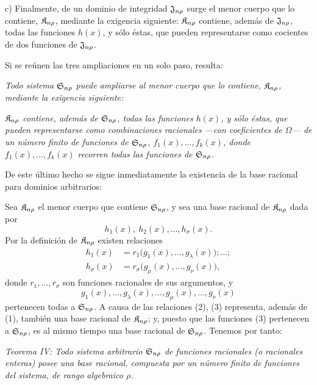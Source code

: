 \documentclass[11pt]{article}
\begin{document}
c) Finalmente, de un dominio de integridad $\mathfrak{J}_{n\rho}$ surge el menor cuerpo que lo contiene, $\mathfrak{K}_{n\rho}$, mediante la exigencia siguiente: $\mathfrak{K}_{n\rho}$ contiene, además de $\mathfrak{J}_{n\rho}$, todas las funciones $h(x)$, y sólo éstas, que pueden representarse como cocientes de dos funciones de $\mathfrak{J}_{n\rho}$.

Si se reúnen las tres ampliaciones en un solo paso, resulta:

\emph{Todo sistema $\mathfrak{S}_{n\rho}$ puede ampliarse al menor cuerpo que lo contiene, $\mathfrak{K}_{n\rho}$, mediante la exigencia siguiente:}

\emph{$\mathfrak{K}_{n\rho}$ contiene, además de $\mathfrak{S}_{n\rho}$, todas las funciones $h(x)$, y sólo éstas, que pueden representarse como combinaciones racionales ---con coeficientes de $\Omega$--- de un número finito de funciones de $\mathfrak{S}_{n\rho}$, $f_1(x),\ldots,f_k(x)$, donde $f_1(x),\ldots,f_k(x)$ recorren todas las funciones de $\mathfrak{S}_{n\rho}$.}

De este último hecho se sigue inmediatamente la existencia de la base racional para dominios arbitrarios:

Sea $\mathfrak{K}_{n\rho}$ el menor cuerpo que contiene $\mathfrak{S}_{n\rho}$, y sea una base racional de $\mathfrak{K}_{n\rho}$ dada por
\begin{equation}
  h_1(x),\ h_2(x),\ldots,h_\sigma(x).
\tag{1}
\end{equation}
Por la definición de $\mathfrak{K}_{n\rho}$ existen relaciones
\begin{equation}
\begin{aligned}
 h_1(x)&=r_1\bigl(g_1(x),\ldots,g_\lambda(x)\bigr);\ldots;\\
 h_\sigma(x)&=r_\sigma\bigl(g_\mu(x),\ldots,g_\nu(x)\bigr),
\end{aligned}
\tag{2}
\end{equation}
donde $r_1,
\ldots,r_\sigma$ son funciones racionales de sus argumentos, y
\begin{equation}
  g_1(x),\ldots,g_\lambda(x),\ldots,
  g_\mu(x),\ldots,g_\nu(x)
\tag{3}
\end{equation}
pertenecen todas a $\mathfrak{S}_{n\rho}$. A causa de las relaciones (2), (3) representa, además de (1), también una base racional de $\mathfrak{K}_{n\rho}$; y, puesto que las funciones (3) pertenecen a $\mathfrak{S}_{n\rho}$, es al mismo tiempo una base racional de $\mathfrak{S}_{n\rho}$. Tenemos por tanto:

\emph{Teorema IV: Todo sistema arbitrario $\mathfrak{S}_{n\rho}$ de funciones racionales (o racionales enteras) posee una base racional, compuesta por un número finito de funciones del sistema, de rango algebraico $\rho$.}
\end{document}
